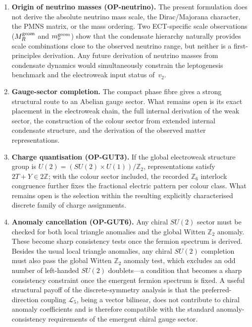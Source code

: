 \documentclass[11pt,a4paper]{article}
\begin{document}
\begin{enumerate}
\item \textbf{Origin of neutrino masses (OP-neutrino).} The present formulation does not derive the absolute neutrino mass scale, the Dirac/Majorana character, the PMNS matrix, or the mass ordering. Two ECT-specific scale observations ($M_R^{\rm geom}$ and $m_\nu^{\rm geom}$) show that the condensate hierarchy naturally provides scale combinations close to the observed neutrino range, but neither is a first-principles derivation. Any future derivation of neutrino masses from condensate dynamics would simultaneously constrain the leptogenesis benchmark and the electroweak input status of~$v_2$.

\item \textbf{Gauge-sector completion.} The compact phase fibre gives a strong structural route to an Abelian gauge sector. What remains open is its exact placement in the electroweak chain, the full internal derivation of the weak sector, the construction of the colour sector from extended internal condensate structure, and the derivation of the observed matter representations.

\item \textbf{Charge quantisation (OP-GUT3).} If the global electroweak structure group is $U(2) = (SU(2) \times U(1))/\mathbb{Z}_2$, representations satisfy $2T + Y \in 2\mathbb{Z}$; with the colour sector included, the recorded $\mathbb{Z}_6$ interlock congruence further fixes the fractional electric pattern per colour class. What remains open is the selection within the resulting explicitly characterised discrete family of charge assignments.

\item \textbf{Anomaly cancellation (OP-GUT6).} Any chiral $SU(2)$ sector must be checked for both local triangle anomalies and the global Witten $\mathbb{Z}_2$ anomaly. These become sharp consistency tests once the fermion spectrum is derived. Besides the usual local triangle anomalies, any chiral $SU(2)$ completion must also pass the global Witten $\mathbb{Z}_2$ anomaly test, which excludes an odd number of left-handed $SU(2)$ doublets---a condition that becomes a sharp consistency constraint once the emergent fermion spectrum is fixed. A useful structural payoff of the discrete-symmetry analysis is that the preferred-direction coupling $\mathcal{L}_5$, being a vector bilinear, does not contribute to chiral anomaly coefficients and is therefore compatible with the standard anomaly-consistency requirements of the emergent chiral gauge sector.


\end{enumerate}
\end{document}
